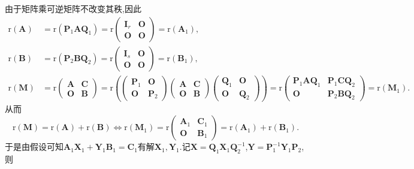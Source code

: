 \documentclass[lang=cn,newtx,10pt,scheme=chinese]{elegantbook}
\begin{document}
\begin{note}
由于矩阵乘可逆矩阵不改变其秩,因此
\begin{align*}
\mathrm{r}(\boldsymbol{A})&=\mathrm{r}(\boldsymbol{P}_1\boldsymbol{AQ}_1)=\mathrm{r}\begin{pmatrix}
\boldsymbol{I}_r & \boldsymbol{O} \\
\boldsymbol{O} & \boldsymbol{O}
\end{pmatrix}=\mathrm{r}(\boldsymbol{A}_1),\\
\mathrm{r}(\boldsymbol{B})&=\mathrm{r}(\boldsymbol{P}_2\boldsymbol{BQ}_2)=\mathrm{r}\begin{pmatrix}
\boldsymbol{I}_s & \boldsymbol{O} \\
\boldsymbol{O} & \boldsymbol{O}
\end{pmatrix}=\mathrm{r}(\boldsymbol{B}_1),\\
\mathrm{r}(\boldsymbol{M})&=\mathrm{r}\begin{pmatrix}
\boldsymbol{A} & \boldsymbol{C} \\
\boldsymbol{O} & \boldsymbol{B}
\end{pmatrix}=\mathrm{r}\left(\begin{pmatrix}
\boldsymbol{P}_1 & \boldsymbol{O} \\
\boldsymbol{O} & \boldsymbol{P}_2
\end{pmatrix}\begin{pmatrix}
\boldsymbol{A} & \boldsymbol{C} \\
\boldsymbol{O} & \boldsymbol{B}
\end{pmatrix}\begin{pmatrix}
\boldsymbol{Q}_1 & \boldsymbol{O} \\
\boldsymbol{O} & \boldsymbol{Q}_2
\end{pmatrix}\right)
=\mathrm{r}\begin{pmatrix}
\boldsymbol{P}_1\boldsymbol{AQ}_1 & \boldsymbol{P}_1\boldsymbol{CQ}_2 \\
\boldsymbol{O} & \boldsymbol{P}_2\boldsymbol{BQ}_2
\end{pmatrix}=\mathrm{r}(\boldsymbol{M}_1).
\end{align*}
从而
\[
\mathrm{r}(\boldsymbol{M})=\mathrm{r}(\boldsymbol{A})+\mathrm{r}(\boldsymbol{B})\Leftrightarrow\mathrm{r}(\boldsymbol{M}_1)=\mathrm{r}\begin{pmatrix}
\boldsymbol{A}_1 & \boldsymbol{C}_1 \\
\boldsymbol{O} & \boldsymbol{B}_1
\end{pmatrix}=\mathrm{r}(\boldsymbol{A}_1)+\mathrm{r}(\boldsymbol{B}_1).
\]
于是由假设可知\(\boldsymbol{A}_1\boldsymbol{X}_1+\boldsymbol{Y}_1\boldsymbol{B}_1=\boldsymbol{C}_1\)有解\(\boldsymbol{X}_1,\boldsymbol{Y}_1\).记\(\boldsymbol{X}=\boldsymbol{Q}_1\boldsymbol{X}_1\boldsymbol{Q}_{2}^{-1}\),\(\boldsymbol{Y}=\boldsymbol{P}_{1}^{-1}\boldsymbol{Y}_1\boldsymbol{P}_2\),则

\end{note}
\end{document}
